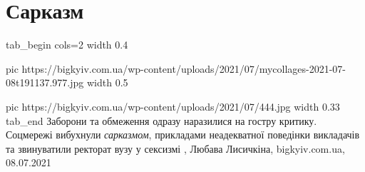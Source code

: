  
 
 
 
 
\chapter{Сарказм}
\label{sec:slova.sarkazm}

\ifcmt
tab_begin cols=2
	width 0.4

  pic https://bigkyiv.com.ua/wp-content/uploads/2021/07/mycollages-2021-07-08t191137.977.jpg
	width 0.5

	pic https://bigkyiv.com.ua/wp-content/uploads/2021/07/444.jpg
	width 0.33
tab_end
\fi
Заборони та обмеження одразу наразилися на гостру критику. Соцмережі вибухнули
\emph{сарказмом}, прикладами неадекватної поведінки викладачів та звинуватили
ректорат вузу у сексизмі
, 
Любава Лисичкіна, bigkyiv.com.ua, 08.07.2021
